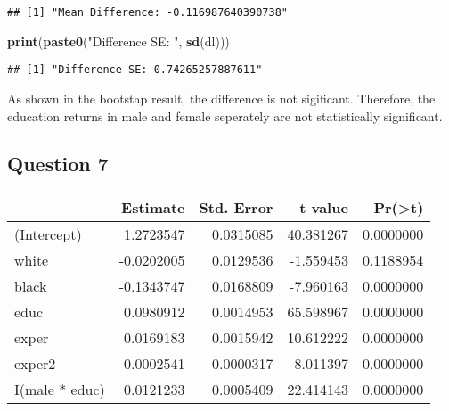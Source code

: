 \documentclass[
]{article}
\newenvironment{Shaded}{\begin{snugshade}}{\end{snugshade}}
\newcommand{\DataTypeTok}[1]{\textcolor[rgb]{0.13,0.29,0.53}{#1}}
\newcommand{\DecValTok}[1]{\textcolor[rgb]{0.00,0.00,0.81}{#1}}
\newcommand{\KeywordTok}[1]{\textcolor[rgb]{0.13,0.29,0.53}{\textbf{#1}}}
\newcommand{\NormalTok}[1]{#1}
\newcommand{\OperatorTok}[1]{\textcolor[rgb]{0.81,0.36,0.00}{\textbf{#1}}}
\newcommand{\StringTok}[1]{\textcolor[rgb]{0.31,0.60,0.02}{#1}}
\begin{document}
\begin{verbatim}
## [1] "Mean Difference: -0.116987640390738"
\end{verbatim}

\begin{Shaded}
\begin{Highlighting}[]
\KeywordTok{print}\NormalTok{(}\KeywordTok{paste0}\NormalTok{(}\StringTok{"Difference SE: "}\NormalTok{, }\KeywordTok{sd}\NormalTok{(dl)))}
\end{Highlighting}
\end{Shaded}

\begin{verbatim}
## [1] "Difference SE: 0.74265257887611"
\end{verbatim}

As shown in the bootstap result, the difference is not sigificant.
Therefore, the education returns in male and female seperately are not
statistically significant.

\hypertarget{question-7}{%
\subsection{Question 7}\label{question-7}}

\begin{Shaded}
\end{Shaded}

\begin{longtable}[]{@{}lrrrr@{}}
\toprule
& Estimate & Std. Error & t value &
Pr(\textgreater{}\textbar{}t\textbar{})\tabularnewline
\midrule
\endhead
(Intercept) & 1.2723547 & 0.0315085 & 40.381267 &
0.0000000\tabularnewline
white & -0.0202005 & 0.0129536 & -1.559453 & 0.1188954\tabularnewline
black & -0.1343747 & 0.0168809 & -7.960163 & 0.0000000\tabularnewline
educ & 0.0980912 & 0.0014953 & 65.598967 & 0.0000000\tabularnewline
exper & 0.0169183 & 0.0015942 & 10.612222 & 0.0000000\tabularnewline
exper2 & -0.0002541 & 0.0000317 & -8.011397 & 0.0000000\tabularnewline
I(male * educ) & 0.0121233 & 0.0005409 & 22.414143 &
0.0000000\tabularnewline
\bottomrule
\end{longtable}
\end{document}
